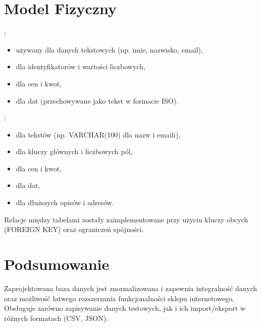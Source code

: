 \documentclass[letterpaper,10pt,english]{sphinxmanual}
\begin{document}
\section{Model Fizyczny}
\label{\detokenize{rozdzial3/index:model-fizyczny}}
\sphinxAtStartPar
{}:
\begin{itemize}
\item {} 
\sphinxAtStartPar
{} używany dla danych tekstowych (np. imie, nazwisko, email),

\item {} 
\sphinxAtStartPar
{} dla identyfikatorów i wartości liczbowych,

\item {} 
\sphinxAtStartPar
{} dla cen i kwot,

\item {} 
\sphinxAtStartPar
{} dla dat (przechowywane jako tekst w formacie ISO).

\end{itemize}

\sphinxAtStartPar
{}:
\begin{itemize}
\item {} 
\sphinxAtStartPar
{} dla tekstów (np. VARCHAR(100) dla nazw i emaili),

\item {} 
\sphinxAtStartPar
{} dla kluczy głównych i liczbowych pól,

\item {} 
\sphinxAtStartPar
{} dla cen i kwot,

\item {} 
\sphinxAtStartPar
{} dla dat,

\item {} 
\sphinxAtStartPar
{} dla dłuższych opisów i adresów.

\end{itemize}

\sphinxAtStartPar
Relacje między tabelami zostały zaimplementowane przy użyciu kluczy obcych (FOREIGN KEY) oraz ograniczeń spójności.


\section{Podsumowanie}
\label{\detokenize{rozdzial3/index:podsumowanie}}
\sphinxAtStartPar
Zaprojektowana baza danych jest znormalizowana i zapewnia integralność danych oraz możliwość łatwego rozszerzania funkcjonalności sklepu internetowego. Obsługuje zarówno zapisywanie danych testowych, jak i ich import/eksport w różnych formatach (CSV, JSON).
\end{document}
